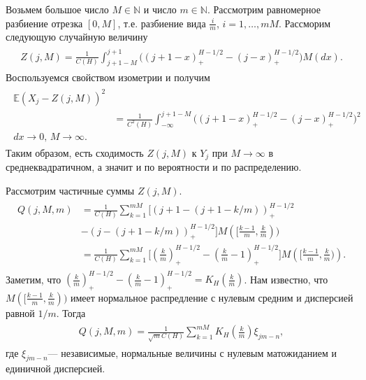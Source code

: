 \documentclass[a4paper,12pt]{article}
\numberwithin{equation}{section}
\newcommand{\N}{\mathbb N}
\newcommand{\dd}{d}
\begin{document}
	Возьмем большое число $M \in \N$ и число $m \in \N$. Рассмотрим равномерное разбиение отрезка $[0, M]$, т.е. разбиение вида $\frac{i}{m}$, $i = 1, \ldots, mM$. Рассморим следующую случайную величину 
	\begin{align}
	\begin{split}
	Z(j,M) = \frac{1}{C(H)}\int_{j+1-M}^{j+1} \biggr((j+1-x)_{+}^{H-1/2} - (j-x)_{+}^{H-1/2}  \biggr)M(\dd x).
	\end{split}
	\end{align}  
	Воспользуемся свойством изометрии и получим
	\begin{align}
	\begin{split}
	\mathbb{E}(X_j-Z(j,M))^2 \\ &= \frac{1}{C^2(H)}\int_{-\infty}^{j+1-M}\biggr((j+1-x)_{+}^{H-1/2} - (j-x)_{+}^{H-1/2}  \biggr)^2 \\ \dd x \to 0, \, M \to \infty.  
	\end{split}
	\end{align}  
	Таким образом, есть сходимость $Z(j,M)$ к $Y_j$ при $M \to \infty$ в среднеквадратичном, а значит и по вероятности и по распределению. 
	
	Рассмотрим частичные суммы $Z(j,M)$. 
	\begin{align}
	\begin{split}
	Q(j, M, m) &= \frac{1}{C(H)} \sum_{k=1}^{mM} \biggr[(j+1-(j+1-k/m))_{+}^{H-1/2} \\ &- (j-(j+1-k/m))_{+}^{H-1/2}\biggr] M([\frac{k-1}{m}, \frac{k}{m}))\\ &= \frac{1}{C(H)} \sum_{k=1}^{mM} \biggr[\left(\frac{k}{m}\right)_{+}^{H-1/2} - \left(\frac{k}{m}-1\right)_{+}^{H-1/2}\biggr] M\left(\bigr[\frac{k-1}{m}, \frac{k}{m}\bigr)\right). 
	\end{split}
	\end{align}
	Заметим, что $(\frac{k}{m})_{+}^{H-1/2} - (\frac{k}{m}-1)_{+}^{H-1/2} = K_H(\frac{k}{m})$. Нам известно, что $M([\frac{k-1}{m}, \frac{k}{m}))$ имеет нормальное распредление с нулевым средним и дисперсией равной $1/m$. Тогда
	\begin{align}
	\begin{split}
	Q(j, M, m) = \frac{1}{\sqrt{m}C(H)} \sum_{k=1}^{mM} K_H(\frac{k}{m})\xi_{jm-n}, 
	\end{split}
	\end{align}
	где $\xi_{jm-n}$--- независимые, нормальные величины с нулевым матожиданием и единичной дисперсией. 
	
\end{document}
